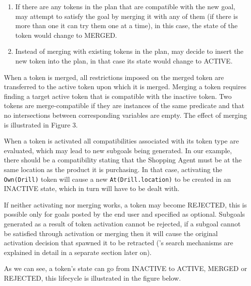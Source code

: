 \begin{description}
\begin{enumerate}

\item If there are any tokens in the plan that are compatible with the
  new goal, \eu may attempt to satisfy the goal by merging it with any
  of them (if there is more than one it can try them one at a time),
  in this case, the state of the token would change to MERGED.

\item Instead of merging with existing tokens in the plan, \eu may
  decide to insert the new token into the plan, in that case its state
  would change to ACTIVE.

\end{enumerate}

When a token is merged, all restrictions imposed on the merged token
are transferred to the active token upon which it is merged. Merging a
token requires finding a target active token that is compatible with
the inactive token. Two tokens are merge-compatible if they are
instances of the same predicate and that no intersections between
corresponding variables are empty. The effect of merging is
illustrated in Figure 3.


When a token is activated all compatibilities associated with its
token type are evaluated, which may lead to new subgoals being
generated. In our example, there should be a compatibility stating
that the Shopping Agent must be at the same location as the product it
is purchasing. In that case, activating the \texttt{Own(Drill)} token
will cause a new \texttt{At(Drill.location)} to be created in an
INACTIVE state, which in turn will have to be dealt with.


If neither activating nor merging works, a token may become REJECTED,
this is possible only for goals posted by the end user and specified
as optional. Subgoals generated as a result of token activation cannot
be rejected, if a subgoal cannot be satisfied through activation or
merging then it will cause the original activation decision that
spawned it to be retracted (\eu's search mechanisms are explained in
detail in a separate section later on).

As we can see, a token's state can go from INACTIVE to ACTIVE, MERGED
or REJECTED, this lifecycle is illustrated in the figure below.


\end{description}
